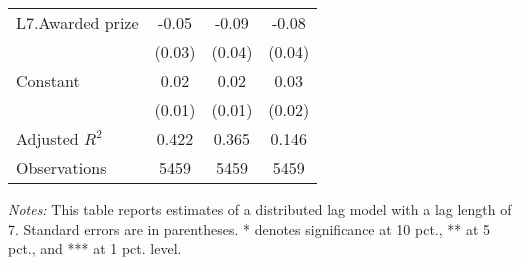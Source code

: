 \begin{table}[htbp]
{\begin{threeparttable}
\begin{tabular}{l*{3}{c}}
L7.Awarded prize&    -0.05         &    -0.09\sym{**} &    -0.08\sym{**} \\
                &   (0.03)         &   (0.04)         &   (0.04)         \\
Constant        &     0.02\sym{***}&     0.02\sym{***}&     0.03\sym{**} \\
                &   (0.01)         &   (0.01)         &   (0.02)         \\
\midrule
Adjusted \(R^{2}\)&    0.422         &    0.365         &    0.146         \\
Observations    &     5459         &     5459         &     5459         \\
\bottomrule \end{tabular} \begin{tablenotes}[flushleft] \footnotesize \item \emph{Notes:} This table reports estimates of a distributed lag model with a lag length of 7. Standard errors are in parentheses. * denotes significance at 10 pct., ** at 5 pct., and *** at 1 pct. level. \end{tablenotes} \end{threeparttable} } \end{table}

